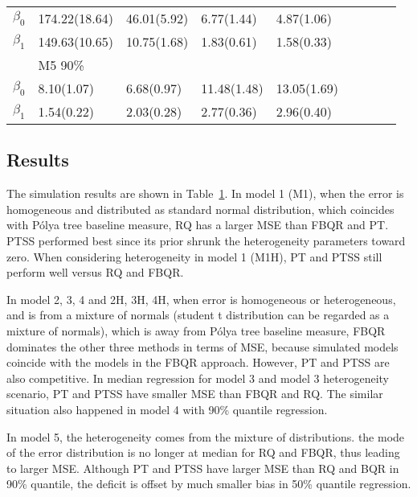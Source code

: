 \documentclass[12pt]{article}
\newcommand{\polya}{P\'{o}lya}
\begin{document}
\begin{center}
\begin{table}[h]
\begin{tabular}[tb]{c|llll|llll}
      $\beta_0$ & 174.22(18.64) & 46.01(5.92) & 6.77(1.44)  & 4.87(1.06)  &              &             &             &             \\
      $\beta_1$ & 149.63(10.65) & 10.75(1.68) & 1.83(0.61)  & 1.58(0.33)  &              &             &             &             \\
                & M5 90\%       &             &             &             &              &             &             &             \\
      $\beta_0$ & 8.10(1.07)    & 6.68(0.97)  & 11.48(1.48) & 13.05(1.69) &              &             &             &             \\
      $\beta_1$ & 1.54(0.22)    & 2.03(0.28)  & 2.77(0.36)  & 2.96(0.40)  &              &             &             &             \\
\hline
    \end{tabular}
    \label{ch2:tab:m1}
  \end{table}
\end{center}

\subsection{Results}
The simulation results are shown in Table~\ref{ch2:tab:m1}.  In model 1
(M1), when the error is homogeneous and distributed as standard normal
distribution, which coincides with \polya{} tree baseline measure, RQ
has a larger MSE than FBQR and PT. PTSS performed best since its prior
shrunk the heterogeneity parameters toward zero.  When considering
heterogeneity in model 1 (M1H), PT and PTSS still perform well versus
RQ and FBQR.

In model 2, 3, 4 and 2H, 3H, 4H, when error is homogeneous or
heterogeneous, and is from a mixture of normals (student t
distribution can be regarded as a mixture of normals), which is away
from \polya{} tree baseline measure, FBQR dominates the other three
methods in terms of MSE, because simulated models coincide with the
models in the FBQR approach. However, PT and PTSS are also
competitive.  In median regression for model 3 and model 3
heterogeneity scenario, PT and PTSS have smaller MSE than FBQR and RQ.
The similar situation also happened in model 4 with 90\% quantile
regression.

In model 5, the heterogeneity comes from the mixture of distributions.
the mode of the error distribution is no longer at median for RQ and
FBQR, thus leading to larger MSE. Although PT and PTSS have larger MSE
than RQ and BQR in 90\% quantile, the deficit is offset by much
smaller bias in 50\% quantile regression.
\end{document}
